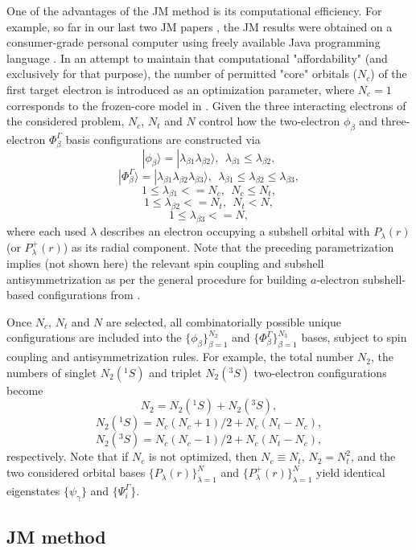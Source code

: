 \documentclass[aip
, pra
, showpacs
, aps
, twocolumn
, groupedaddress
, floatfix
]{revtex4}
\newcommand{\beq}{\begin{equation}}
\newcommand{\eeq}{\end{equation}}
\begin{document}
One of the advantages of the JM method is its computational efficiency.
For example, so far in our last two JM papers \cite{KB10p022708, KFB11},
the JM results were obtained on a consumer-grade personal computer using freely available Java programming language \cite{JMatrixWebsite}.
In an attempt to maintain that computational "affordability" (and exclusively for that purpose),
the number of permitted "core" orbitals ($N_c$) of the first target electron is introduced as
an optimization parameter,
where $N_c=1$ corresponds to the frozen-core model in \cite{KFB11}.
Given the three interacting electrons of the considered problem, $N_c$, $N_t$ and $N$ control
how the two-electron $\phi_\beta$ and three-electron $\Phi_\beta^\Gamma$ basis configurations are constructed via
\beq
| \phi_\beta \rangle = | \lambda_{\beta 1} \lambda_{\beta 2} \rangle, \ \ \lambda_{\beta 1} \leq \lambda_{\beta 2},
\eeq
\beq
| \Phi_\beta^\Gamma \rangle = | \lambda_{\beta 1} \lambda_{\beta 2} \lambda_{\beta 3} \rangle,
\ \ \lambda_{\beta 1} \leq \lambda_{\beta 2} \leq \lambda_{\beta 3},
\eeq
\beq
1 \leq \lambda_{\beta 1} <= N_c, \ \ N_c \leq N_t,
\eeq
\beq
1 \leq \lambda_{\beta 2} <= N_t, \ \ N_t < N,
\eeq
\beq
1 \leq \lambda_{\beta 3} <= N,
\eeq
where each used $\lambda$ describes an electron occupying a subshell orbital
with $P_\lambda(r)$ (or $P^+_\lambda(r)$) as its radial component.
Note that the preceding parametrization implies (not shown here) the relevant spin coupling and subshell antisymmetrization
as per the general procedure for building $a$-electron subshell-based configurations from \cite{KFB11}.


Once $N_c$, $N_t$ and $N$ are selected,
all combinatorially possible unique configurations are included into the $\{ \phi_{\beta} \}_{\beta=1}^{N_2}$
and $\{ \Phi_\beta^\Gamma \}_{\beta=1}^{N_3}$ bases,
subject to spin coupling and antisymmetrization rules.
For example, the total number $N_2$, the numbers of singlet $N_2({^1S})$ and triplet $N_2({^3S})$ two-electron configurations become
\beq
N_2=N_2({^1S}) + N_2({^3S}),
\label{N_2}
\eeq
\beq
N_2({^1S})=N_c(N_c+1)/2+ N_c (N_t-N_c),
\label{N_1S}
\eeq
\beq
N_2({^3S})=N_c(N_c-1)/2+ N_c (N_t-N_c),
\label{N_3S}
\eeq
respectively. Note that if $N_c$ is not optimized, then $N_c \equiv N_t$, $N_2 = N_t^2$, and the two considered orbital bases
$\{ P_\lambda(r) \}_{\lambda=1}^N$ and $\{ P^+_\lambda(r) \}_{\lambda=1}^N$ yield identical eigenstates
$\{ \psi_{\gamma} \}$ and $\{ \Psi_i^\Gamma \}$.



\subsection{JM method}
\end{document}
